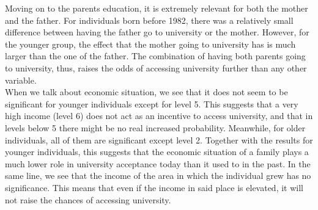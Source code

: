 \documentclass[12pt]{article}
\begin{document}
Moving on to the parents education, it is extremely relevant for both the mother and the father. For individuals born before 1982, there was a relatively small difference between having the father go to university or the mother. However, for the younger group, the effect that the mother going to university has is much larger than the one of the father. The combination of having both parents going to university, thus, raises the odds of accessing university further than any other variable. \\
When we talk about economic situation, we see that it does not seem to be significant for younger individuals except for level 5. This suggests that a very high income (level 6) does not act as an incentive to access university, and that in levels below 5 there might be no real increased probability. Meanwhile, for older individuals, all of them are significant except level 2. Together with the results for younger individuals, this suggests that the economic situation of a family plays a much lower role in university acceptance today than it used to in the past. In the same line, we see that the income of the area in which the individual grew has no significance. This means that even if the income in said place is elevated, it will not raise the chances of accessing university.\\
\end{document}
